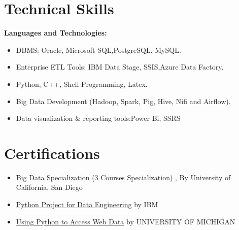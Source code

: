 \documentclass{res}
\begin{document}
\begin{resume}
\section{Technical Skills}          
  \textbf {Languages and Technologies:} \vspace{2 mm } 
  \begin{itemize}
  	\item DBMS: Oracle, Microsoft SQL,PostgreSQL, MySQL.
  	\item Enterprise ETL Tools: IBM Data Stage, SSIS,Azure Data Factory.
  	\item Python, C++, Shell Programming, Latex.
  	\item Big Data Development (Hadoop, Spark, Pig, Hive, Nifi and Airflow).
  	\item Data visualization \& reporting tools:Power Bi, SSRS
  \end{itemize}     
 
\section{Certifications}          
   \begin{itemize}
   	\item \href{https://www.coursera.org/specializations/big-data}{Big Data Specialization (3 Courses Specialization)} , By University of California, San Diego
   	\item \href{https://www.coursera.org/learn/python-project-for-data-engineering/home/welcome}{Python Project for Data Engineering} by IBM
   	\item \href{https://www.coursera.org/learn/python-network-data/home/welcome}{Using Python to Access Web Data} by UNIVERSITY OF MICHIGAN
   \end{itemize}      
 
\end{resume}
\end{document}
